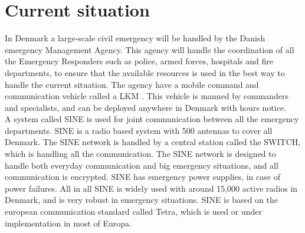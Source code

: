 \section{Current situation}
In Denmark a large-scale civil emergency will be handled by the Danish emergency Management Agency. This agency will handle the coordination of all the Emergency Responders such as police, armed forces, hospitals and fire departments, to ensure that the available resources is used in the best way to handle the current situation. The agency have a mobile command and communication vehicle called a LKM \cite{Beredskom}. This vehicle is manned by commanders and specialists, and can be deployed anywhere in Denmark with hours notice. \\

A system called SINE \cite{SINE_artikel} is used for joint communication between all the emergency departments. SINE is a radio based system with 500 antennas to cover all Denmark. The SINE network is handled by a central station called the SWITCH, which is handling all the communication. The SINE network is designed to handle both everyday communication and big emergency situations, and all communication is encrypted. SINE has emergency power supplies, in case of power failures. All in all SINE is widely used with around 15,000 active radios in Denmark, and is very robust in emergency situations. SINE is based on the european communication standard called Tetra, which is used or under implementation in most of Europa.